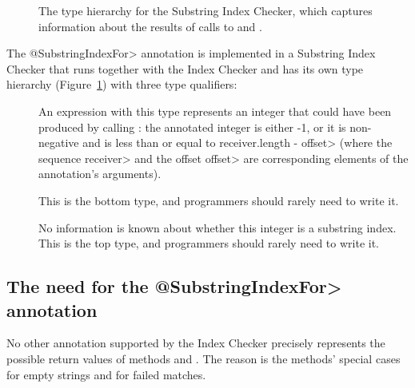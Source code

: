 \begin{figure}
\begin{center}
  \hfill
  \hfill
\end{center}
  \caption{The type hierarchy for the Substring Index Checker, which
    captures information about the results of calls to
    and
    .}
  \label{fig-index-substringindex}
\end{figure}

The \<@SubstringIndexFor> annotation is implemented in a Substring Index
Checker that runs together with the Index Checker and has its own type
hierarchy (Figure~\ref{fig-index-substringindex}) with three type
qualifiers:
\begin{description}
\item[]
  An expression with this type represents an integer that could have been
  produced by calling
  :
  the annotated integer is either -1, or it is non-negative and is less
  than or equal to \<receiver.length - offset> (where the sequence
  \<receiver> and the offset \<offset> are corresponding elements of the
  annotation's arguments).
\item[]
  This is the bottom type, and programmers should rarely need to write it.
\item[]
  No information is known about whether this integer is a substring index.
  This is the top type, and programmers should rarely need to write it.
\end{description}


\subsection{The need for the \<@SubstringIndexFor> annotation\label{index-substringindex-justification}}

No other annotation supported by the Index Checker precisely represents the
possible return values of methods
and
.
The reason is the methods' special cases for empty strings and for failed matches.

